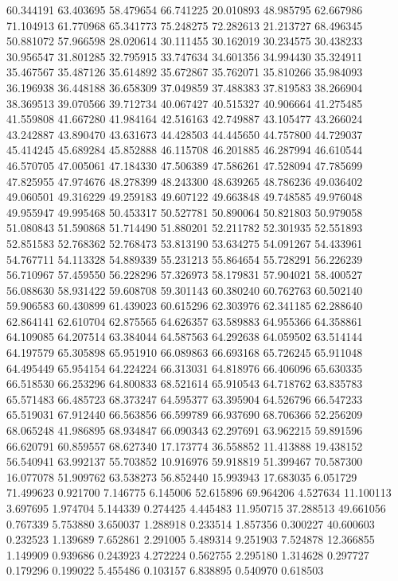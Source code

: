 60.344191
63.403695
58.479654
66.741225
20.010893
48.985795
62.667986
71.104913
61.770968
65.341773
75.248275
72.282613
21.213727
68.496345
50.881072
57.966598
28.020614
30.111455
30.162019
30.234575
30.438233
30.956547
31.801285
32.795915
33.747634
34.601356
34.994430
35.324911
35.467567
35.487126
35.614892
35.672867
35.762071
35.810266
35.984093
36.196938
36.448188
36.658309
37.049859
37.488383
37.819583
38.266904
38.369513
39.070566
39.712734
40.067427
40.515327
40.906664
41.275485
41.559808
41.667280
41.984164
42.516163
42.749887
43.105477
43.266024
43.242887
43.890470
43.631673
44.428503
44.445650
44.757800
44.729037
45.414245
45.689284
45.852888
46.115708
46.201885
46.287994
46.610544
46.570705
47.005061
47.184330
47.506389
47.586261
47.528094
47.785699
47.825955
47.974676
48.278399
48.243300
48.639265
48.786236
49.036402
49.060501
49.316229
49.259183
49.607122
49.663848
49.748585
49.976048
49.955947
49.995468
50.453317
50.527781
50.890064
50.821803
50.979058
51.080843
51.590868
51.714490
51.880201
52.211782
52.301935
52.551893
52.851583
52.768362
52.768473
53.813190
53.634275
54.091267
54.433961
54.767711
54.113328
54.889339
55.231213
55.864654
55.728291
56.226239
56.710967
57.459550
56.228296
57.326973
58.179831
57.904021
58.400527
56.088630
58.931422
59.608708
59.301143
60.380240
60.762763
60.502140
59.906583
60.430899
61.439023
60.615296
62.303976
62.341185
62.288640
62.864141
62.610704
62.875565
64.626357
63.589883
64.955366
64.358861
64.109085
64.207514
63.384044
64.587563
64.292638
64.059502
63.514144
64.197579
65.305898
65.951910
66.089863
66.693168
65.726245
65.911048
64.495449
65.954154
64.224224
66.313031
64.818976
66.406096
65.630335
66.518530
66.253296
64.800833
68.521614
65.910543
64.718762
63.835783
65.571483
66.485723
68.373247
64.595377
63.395904
64.526796
66.547233
65.519031
67.912440
66.563856
66.599789
66.937690
68.706366
52.256209
68.065248
41.986895
68.934847
66.090343
62.297691
63.962215
59.891596
66.620791
60.859557
68.627340
17.173774
36.558852
11.413888
19.438152
56.540941
63.992137
55.703852
10.916976
59.918819
51.399467
70.587300
16.077078
51.909762
63.538273
56.852440
15.993943
17.683035
6.051729
71.499623
0.921700
7.146775
6.145006
52.615896
69.964206
4.527634
11.100113
3.697695
1.974704
5.144339
0.274425
4.445483
11.950715
37.288513
49.661056
0.767339
5.753880
3.650037
1.288918
0.233514
1.857356
0.300227
40.600603
0.232523
1.139689
7.652861
2.291005
5.489314
9.251903
7.524878
12.366855
1.149909
0.939686
0.243923
4.272224
0.562755
2.295180
1.314628
0.297727
0.179296
0.199022
5.455486
0.103157
6.838895
0.540970
0.618503
